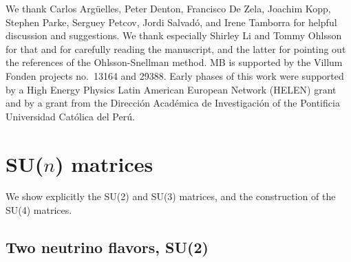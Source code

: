 \documentclass[final,5p,times,twocolumn,sort,compress]{elsarticle}
\begin{document}
We thank Carlos Arg\"uelles, Peter Denton, Francisco De Zela, Joachim Kopp, Stephen Parke, Serguey Petcov, Jordi Salvad\'o, and Irene Tamborra for helpful discussion and suggestions.  We thank especially Shirley Li and Tommy Ohlsson for that and for carefully reading the manuscript, and the latter for pointing out the references of the Ohlsson-Snellman method.  MB is supported by the Villum Fonden projects no.~13164 and 29388.  Early phases of this work were supported by a High Energy Physics Latin American European Network (HELEN) grant and by a grant from the Direcci\'on Acad\'emica de Investigaci\'on of the Pontificia Universidad Cat\'olica del Per\'u. 





% 


\appendix

\renewcommand{\thefigure}{\Alph{section}.\arabic{figure}}
\renewcommand{\thetable}{\Alph{section}.\arabic{table}}
\newcommand{\appresetfloats}{\setcounter{figure}{0}\setcounter{table}{0}%
  \renewcommand{\theHfigure}{\Alph{section}.\arabic{figure}}%
  \renewcommand{\theHtable}{\Alph{section}.\arabic{table}}}



\section{SU($n$) matrices}
\label{app:matrices}
\appresetfloats

We show explicitly the SU(2) and SU(3) matrices, and the construction of the SU(4) matrices.


\subsection{Two neutrino flavors, SU(2)}
\end{document}
